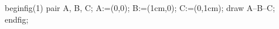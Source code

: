 

\mplibcode
beginfig(1)
    pair A, B, C;
    A:=(0,0); B:=(1cm,0); C:=(0,1cm);
    draw A--B--C;
endfig;
\endmplibcode

\bye
